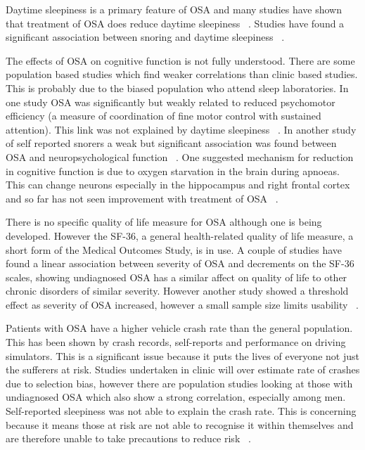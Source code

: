 Daytime sleepiness is a primary feature of OSA and many studies have shown that treatment of OSA does reduce daytime sleepiness ~\cite{ballester1999evidence}. Studies have found a significant association between snoring and daytime sleepiness ~\cite{engleman1999randomized,stradling1991self}.

The effects of OSA on cognitive function is not fully understood. There are some population based studies which find weaker correlations than clinic based studies. This is probably due to the biased population who attend sleep laboratories. In one study OSA was significantly but weakly related to reduced psychomotor efficiency (a measure of coordination of fine motor control with sustained attention). This link was not explained by daytime sleepiness ~\cite{kim1997sleep}. In another study of self reported snorers a weak but significant association was found between OSA and neuropsychological function ~\cite{adams2001relation}. One suggested mechanism for reduction in cognitive function is due to oxygen starvation in the brain during apnoeas. This can change neurons especially in the hippocampus and right frontal cortex and so far has not seen improvement with treatment of OSA ~\cite{gale2004effects}.

There is no specific quality of life measure for OSA although one is being developed. However the SF-36, a general health-related quality of life measure, a short form of the Medical Outcomes Study, is in use. A couple of studies have found a linear association between severity of OSA and decrements on the SF-36 scales, showing undiagnosed OSA has a similar affect on quality of life to other chronic disorders of similar severity. However another study showed a threshold effect as severity of OSA increased, however a small sample size limits usability ~\cite{finn1998sleep,baldwin2001association}.

Patients with OSA have a higher vehicle crash rate than the general population. This has been shown by crash records, self-reports and performance on driving simulators. This is a significant issue because it puts the lives of everyone not just the sufferers at risk. Studies undertaken in clinic will over estimate rate of crashes due to selection bias, however there are population studies looking at those with undiagnosed OSA which also show a strong correlation, especially among men. Self-reported sleepiness was not able to explain the crash rate. This is concerning because it means those at risk are not able to recognise it within themselves and are therefore unable to take precautions to reduce risk ~\cite{findley1988automobile,findley1989driving}.
